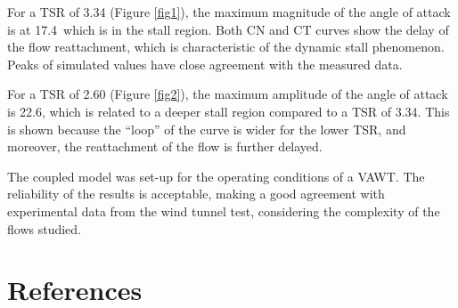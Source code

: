 \documentclass[a4paper]{jpconf}
\begin{document}
For a TSR of 3.34 (Figure \ref{fig1}), the maximum magnitude of the angle of attack is at
17.4\degree\ which is in the stall region. Both CN and CT curves show the delay
of the flow reattachment, which is characteristic of the dynamic stall
phenomenon. Peaks of simulated values have close agreement with the measured
data.

For a TSR of 2.60 (Figure \ref{fig2}), the maximum amplitude of the angle of attack is 22.6\degree, which
is related to a deeper stall region compared to a TSR of 3.34. This is shown
because the ``loop'' of the curve is wider for the lower TSR, and moreover, the
reattachment of the flow is further delayed.

The coupled model was set-up for the operating conditions of a VAWT. The reliability of the results is acceptable, making a good agreement with
experimental data from the wind tunnel test, considering the complexity of the flows studied.












\section*{References}

{}

\end{document}
